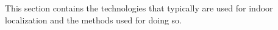 This section contains the technologies that typically are used for indoor localization and the methods used for doing so.